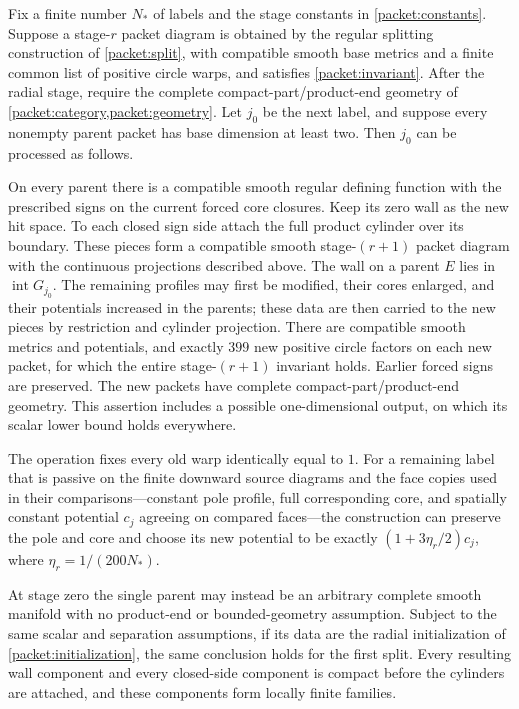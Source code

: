 \begin{theorem}\label{finite:cut}
Fix a finite number $N_*$ of labels and the stage constants in
\eqref{packet:constants}. Suppose a stage-$r$ packet diagram is obtained by
the regular splitting construction of \cref{packet:split}, with compatible
smooth base metrics and a finite common list of positive circle warps,
and satisfies \cref{packet:invariant}. After the radial stage, require the
complete compact-part/product-end geometry of \cref{packet:category,packet:geometry}.
Let $j_0$ be the next label, and suppose every nonempty parent packet has
base dimension at least two. Then $j_0$ can be processed as follows.

On every parent there is a compatible smooth regular defining function
with the prescribed signs on the current forced core closures. Keep its
zero wall as the new hit space. To each closed sign side attach the full
product cylinder over its boundary. These pieces form a compatible smooth
stage-$(r+1)$ packet diagram with the continuous projections described
above. The wall on a parent $E$ lies in $\operatorname{int}G_{j_0}$.
The remaining profiles may first be modified, their cores enlarged,
and their potentials increased in the parents; these data are then carried to the new pieces by restriction and cylinder projection.
There are compatible smooth metrics and potentials, and exactly $399$
new positive circle factors on each new packet, for which the entire
stage-$(r+1)$ invariant holds. Earlier forced signs are preserved.
The new packets have complete compact-part/product-end geometry. This
assertion includes a possible one-dimensional output, on which its scalar
lower bound holds everywhere.

The operation fixes every old warp identically equal to $1$. For a
remaining label that is passive on the finite downward source diagrams
and the face copies used in their comparisons---constant pole profile, full corresponding core, and spatially
constant potential $c_j$ agreeing on compared faces---the construction
can preserve the pole and core and choose its new potential to be exactly
$(1+3\eta_r/2)c_j$, where $\eta_r=1/(200N_*)$.

At stage zero the single parent may instead be an arbitrary complete
smooth manifold with no product-end or bounded-geometry assumption. Subject to the same scalar and separation assumptions, if its
data are the radial initialization of \cref{packet:initialization}, the
same conclusion holds for the first split. Every resulting wall component and every closed-side component is compact before the cylinders are attached, and these components form locally finite
families.
\end{theorem}

